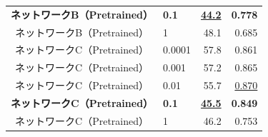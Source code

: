 \documentclass[12pt]{jarticle}
\numberwithin{equation}{section}    %
\numberwithin{figure}{section}      %
\numberwithin{table}{section}      %
\begin{document}
\begin{table}[bt]
\begin{center}
{\begin{tabular}{|c|l|rr|}
                \textbf{ネットワークB（Pretrained）}     & \textbf{0.1}                             & \underline{\textbf{44.2}}    & \textbf{0.778}             \\
                ネットワークB（Pretrained）              & 1                                        & 48.1                         & 0.685                      \\
                \hline
                ネットワークC（Pretrained）              & 0.0001                                   & 57.8                         & 0.861                      \\
                ネットワークC（Pretrained）              & 0.001                                    & 57.2                         & 0.865                      \\
                ネットワークC（Pretrained）              & 0.01                                     & 55.7                         & \underline{0.870}          \\
                \textbf{ネットワークC（Pretrained）}     & \textbf{0.1}                             & \underline{\textbf{45.5}}    & \textbf{0.849}             \\
                ネットワークC（Pretrained）              & 1                                        & 46.2                         & 0.753                      \\
                \hline
            \end{tabular}
        }
    \end{center}
\end{table}
\end{document}
